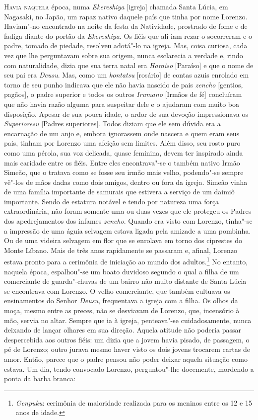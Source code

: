 \noindent\textsc{Havia naquela} época, numa \textit{Ekereshiya} [igreja] chamada Santa
Lúcia, em Nagasaki, no Japão, um rapaz nativo daquele país que tinha
por nome Lorenzo. Haviam"-no encontrado na noite da festa da Natividade,
prostrado de fome e de fadiga diante do portão da \textit{Ekereshiya}.
Os fiéis que ali iam rezar o socorreram e o padre, tomado de piedade,
resolveu adotá"-lo na igreja. Mas, coisa curiosa, cada vez que lhe
perguntavam sobre sua origem, nunca esclarecia a verdade e, rindo com
naturalidade, dizia que sua terra natal era \textit{Haraiso} [Paraíso]
e que o nome de seu pai era \textit{Deusu}. Mas, como um
\textit{kontatsu} [rosário] de contas azuis enrolado em torno de seu
punho indicava que ele não havia nascido de pais \textit{zencho} [gentios, pagãos], 
o padre superior e todos os outros \textit{Irumano} [Irmãos de fé] 
concluíram que não havia razão alguma para suspeitar
dele e o ajudaram com muito boa disposição. Apesar de sua pouca idade,
o ardor de sua devoção impressionava os \textit{Superioresu} [Padres
superiores]. Todos diziam que ele sem dúvida era a encarnação de um
anjo e, embora ignorassem onde nascera e quem eram seus pais, tinham
por Lorenzo uma afeição sem limites. Além disso, seu rosto puro como
uma pérola, sua voz delicada, quase feminina, devem ter inspirado ainda
mais caridade entre os fiéis. Entre eles encontrava"-se o também nativo
Irmão Simeão, que o tratava como se fosse seu irmão mais velho,
podendo"-se sempre vê"-los de mãos dadas como dois amigos, dentro ou fora
da igreja. Simeão vinha de uma família importante de samurais que
estivera a serviço de um daimiô importante. Sendo de estatura notável e
tendo por natureza uma força extraordinária, não foram somente uma ou
duas vezes que ele protegeu os Padres dos apedrejamentos dos infames
\textit{zencho}. Quando era visto com Lorenzo, tinha"-se a impressão de
uma águia selvagem estava ligada pela amizade a uma pombinha. Ou de uma
videira selvagem em flor que se enrolava em torno dos ciprestes do
Monte Líbano. Mais de três anos rapidamente se passaram e, afinal,
Lorenzo estava pronto para a cerimônia de iniciação ao mundo dos
adultos.\footnote{ \textit{Genpuku}: cerimônia de maioridade realizada
para os meninos entre os 12 e 15 anos de idade. } No entanto, naquela
época, espalhou"-se um boato duvidoso segundo o qual a filha de um
comerciante de guarda"-chuvas de um bairro não muito distante de Santa
Lúcia se encontrava com Lorenzo. O velho comerciante, que também
cultuava os ensinamentos do Senhor \textit{Deusu}, frequentava a igreja
com a filha. Os olhos da moça, mesmo entre as preces, não se desviavam
de Lorenzo, que, incensório à mão, servia no altar. Sempre que ia à
igreja, penteava"-se cuidadosamente, nunca deixando de lançar olhares em
sua direção. Aquela atitude não poderia passar despercebida aos outros
fiéis: um dizia que a jovem havia pisado, de passagem, o pé de Lorenzo;
outro jurava mesmo haver visto os dois jovens trocarem cartas de amor.
Então, parece que o padre pensou não poder deixar aquela situação como
estava. Um dia, tendo convocado Lorenzo, perguntou"-lhe docemente,
mordendo a ponta da barba branca:

